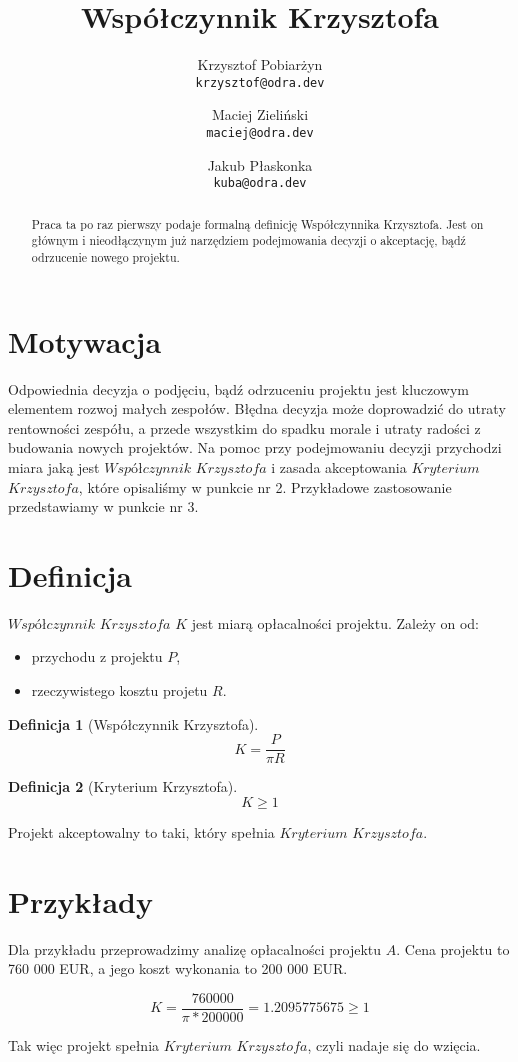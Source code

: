 \documentclass{article}
\title{Współczynnik Krzysztofa}
\author{
  Krzysztof Pobiarżyn\\
  \texttt{krzysztof@odra.dev}
  \and
  Maciej Zieliński\\
  \texttt{maciej@odra.dev}
  \and
  Jakub Płaskonka\\
  \texttt{kuba@odra.dev}
}
\theoremstyle{definition}
\newtheorem{definition}{Definicja}[section]
\begin{document}
\maketitle

\begin{abstract}
Praca ta po raz pierwszy podaje formalną definicję Współczynnika Krzysztofa. Jest on głównym i nieodłączynym już narzędziem podejmowania decyzji o akceptację, bądź odrzucenie nowego projektu.
\end{abstract}

\section{Motywacja}
Odpowiednia decyzja o podjęciu, bądź odrzuceniu projektu jest kluczowym elementem rozwoj małych zespołów. Błędna decyzja może doprowadzić do utraty rentowności zespółu, a przede wszystkim do spadku morale i utraty radości z budowania nowych projektów. Na pomoc przy podejmowaniu decyzji przychodzi miara jaką jest $ Współczynnik$ $Krzysztofa$ i zasada akceptowania $Kryterium$ $Krzysztofa$, które opisaliśmy w punkcie nr 2. Przykładowe zastosowanie przedstawiamy w punkcie nr 3. 

\section{Definicja}

$Współczynnik$ $Krzysztofa$ $K$ jest miarą opłacalności projektu. Zależy on od:

\begin{itemize}
\item przychodu z projektu $P$,
\item rzeczywistego kosztu projetu $R$.
\end{itemize}

\begin{definition}[Współczynnik Krzysztofa]
\[K = \frac{P}{\pi R}\]
\end{definition}

\begin{definition}[Kryterium Krzysztofa]
\[K \ge 1\]
\end{definition}

Projekt akceptowalny to taki, który spełnia $Kryterium$ $Krzysztofa$.

\section{Przykłady}
Dla przykładu przeprowadzimy analizę opłacalności projektu $A$. Cena projektu to 760 000 EUR, a jego koszt wykonania to 200 000 EUR.

\[K = \frac{760000}{\pi * 200000} = 1.2095775675 \ge 1\]

Tak więc projekt spełnia $Kryterium$ $Krzysztofa$, czyli nadaje się do wzięcia.
\end{document}
